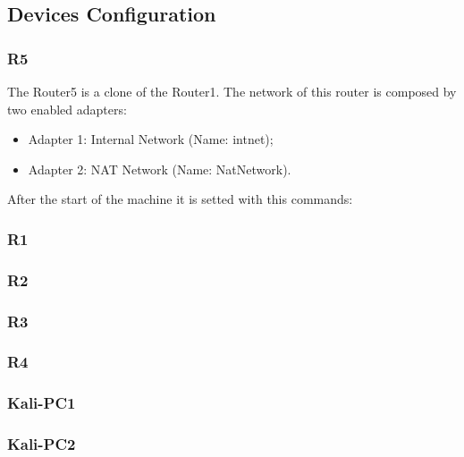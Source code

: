 \subsection{Devices Configuration}

\subsubsection*{R5}
The Router5 is a clone of the Router1.
The network of this router is composed by two enabled adapters:
\begin{itemize}
	\item Adapter 1: Internal Network (Name: intnet);
	\item Adapter 2: NAT Network (Name: NatNetwork).
\end{itemize}
After the start of the machine it is setted with this commands:



\subsubsection*{R1}


\subsubsection*{R2}


\subsubsection*{R3}


\subsubsection*{R4}


\subsubsection*{Kali-PC1}



\subsubsection*{Kali-PC2}



